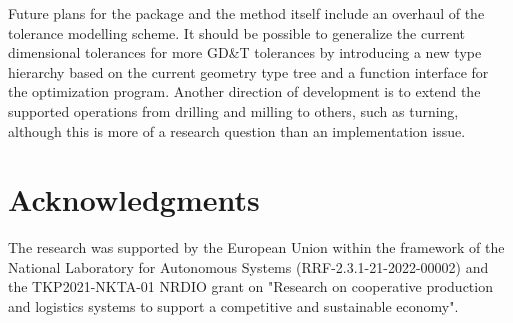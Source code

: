 \documentclass{juliacon}
\begin{document}
Future plans for the package and the method itself include an overhaul of the tolerance modelling scheme.
It should be possible to generalize the current dimensional tolerances for  more GD\&T tolerances by introducing a new type hierarchy based on the current geometry type tree and a function interface for the optimization program.
Another direction of development is to extend the supported operations from drilling and milling to others, such as turning, although this is more of a research question than an implementation issue.

\section{Acknowledgments}
The research was supported by the European Union within the framework of the National Laboratory for Autonomous Systems (RRF-2.3.1-21-2022-00002) and the TKP2021-NKTA-01  NRDIO grant on "Research on cooperative production and logistics systems to support a competitive and sustainable economy".


\end{document}
